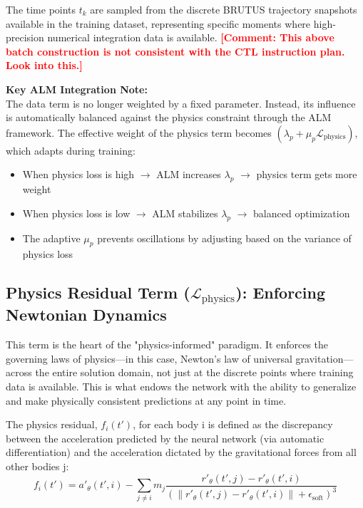 \documentclass{article}
\newcommand{\authcomment}[1]{\textcolor{red}{\textbf{[#1]}}}
\begin{document}
The time points $t_k$ are sampled from the discrete BRUTUS trajectory snapshots available in the training dataset, representing specific moments where high-precision numerical integration data is available.
\authcomment{Comment: This above batch construction is not consistent with the CTL instruction plan. Look into this.}



\textbf{Key ALM Integration Note:} \\
The data term is no longer weighted by a fixed parameter. Instead, its influence is automatically balanced against the physics constraint through the ALM framework. The effective weight of the physics term becomes $(\lambda_p + \mu_p \mathcal{L}_{\text{physics}})$, which adapts during training:
\begin{itemize}
    \item When physics loss is high $\rightarrow$ ALM increases $\lambda_p$ $\rightarrow$ physics term gets more weight
    \item When physics loss is low $\rightarrow$ ALM stabilizes $\lambda_p$ $\rightarrow$ balanced optimization
    \item The adaptive $\mu_p$ prevents oscillations by adjusting based on the variance of physics loss
\end{itemize}


\subsection[Physics Residual Term: Enforcing Newtonian Dynamics]{Physics Residual Term ($\mathcal{L}_{\text{physics}}$): Enforcing Newtonian Dynamics}

This term is the heart of the "physics-informed" paradigm. It enforces the governing laws of physics—in this case, Newton's law of universal gravitation—across the entire solution domain, not just at the discrete points where training data is available. This is what endows the network with the ability to generalize and make physically consistent predictions at any point in time.

The physics residual, $f_i(t')$, for each body $\mathrm{i}$ is defined as the discrepancy between the acceleration predicted by the neural network (via automatic differentiation) and the acceleration dictated by the gravitational forces from all other bodies $\mathrm{j}$:
\[
f_i(t') = a'_{\theta}(t', i) - \sum_{j \neq i} m_j \frac{r'_{\theta}(t', j) - r'_{\theta}(t', i)}{(\|r'_{\theta}(t', j) - r'_{\theta}(t', i)\| + \epsilon_{\text{soft}})^3}
\]
\end{document}
